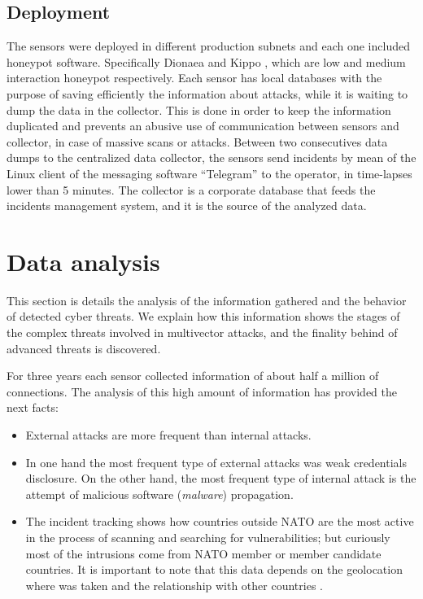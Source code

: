 \documentclass[a4paper]{llncs}
\begin{document}
\subsection{Deployment}
The sensors were deployed in different production subnets and each one included honeypot software. Specifically Dionaea \cite{dionaea} and Kippo \cite{kippo}, which are low and medium interaction honeypot respectively. Each sensor has local databases with the purpose of saving efficiently the information about attacks, while it is waiting to dump the data in the collector. This is done in order to keep the information duplicated and prevents an abusive use of communication between sensors and collector, in case of massive scans or attacks. Between two consecutives data dumps to the centralized data collector, the sensors send incidents by mean of the Linux client of the messaging software ``Telegram'' \cite{telegram-messenger} to the operator, in time-lapses lower than 5 minutes. The collector is a corporate database that feeds the incidents management system, and it is the source of the analyzed data.

\section{Data analysis}
\label{sec:analysis}
This section is details the analysis of the information gathered and the behavior of detected cyber threats. We explain how this information shows the stages of the complex threats involved in multivector attacks, and the finality behind of advanced threats is discovered.

For three years each sensor collected information of about half a million of connections. The analysis of this high amount of information has provided the next facts:
\begin{itemize}
	\item External attacks are more frequent than internal attacks.
	\item In one hand the most frequent type of external attacks was weak credentials disclosure. On the other hand, the most frequent type of internal attack is the attempt of malicious software ({\it malware}) propagation.
	\item The incident tracking shows how countries outside NATO are the most active in the process of scanning and searching for vulnerabilities; but curiously most of the intrusions come from NATO member or member candidate countries. It is important to note that this data depends on the geolocation where was taken and the relationship with other countries \cite{wiki-cyberwarfare-china,wiki-cyberwarfare-eeuu}.
\end{itemize}
\end{document}

